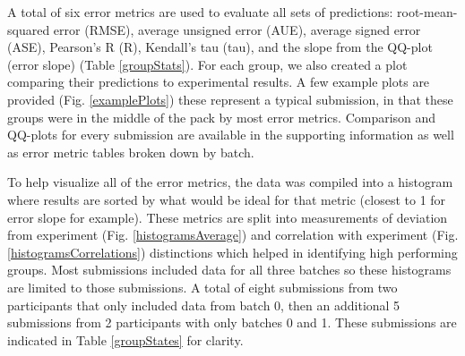 A total of six error metrics are used to evaluate all sets of predictions: root-mean-squared error (RMSE), average unsigned error (AUE), average signed error (ASE), Pearson's R (R), Kendall's tau (tau), and the slope from the QQ-plot (error slope) (Table \ref{groupStats}). 
For each group, we also created a plot comparing their predictions to experimental results.
A few example plots are provided (Fig. \ref{examplePlots}) these represent a typical submission, in that these groups were in the middle of the pack by most error metrics. 
Comparison and QQ-plots for every submission are available in the supporting information as well as error metric tables broken down by batch. 

\begin{figure*} %
\caption{}
\label{histogramsAverage}       %
\end{figure*}

\begin{figure*} %
\caption{}
\label{histogramsCorrelations}       %
\end{figure*}

To help visualize all of the error metrics, the data was compiled into a histogram where results are sorted by what would be ideal for that metric (closest to 1 for error slope for example). 
These metrics are split into measurements of deviation from experiment (Fig. \ref{histogramsAverage}) and correlation with experiment (Fig. \ref{histogramsCorrelations}) distinctions which helped in identifying high performing groups. 
Most submissions included data for all three batches so these histograms are limited to those submissions. 
A total of eight submissions from two participants that only included data from batch 0, then an additional 5 submissions from 2 participants with only batches 0 and 1.
These submissions are indicated in Table \ref{groupStates} for clarity.

